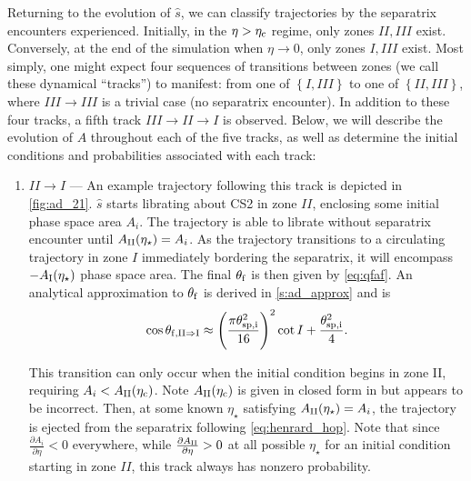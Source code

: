 \documentclass[
        fleqn,
        usenatbib,
        referee,
    ]{mnras}
\newcommand*{\pd}[2]{\frac{\partial#1}{\partial#2}}
\newcommand*{\p}[1]{\left(#1\right)}
\newcommand*{\z}[1]{\left\{#1\right\}}
\begin{document}
Returning to the evolution of $\hat{s}$, we can classify trajectories by the
separatrix encounters experienced. Initially, in the $\eta > \eta_{\rm c}$ regime,
only zones $II, III$ exist. Conversely, at the end of the simulation when $\eta
\to 0$, only zones $I, III$ exist. Most simply, one might expect four sequences
of transitions between zones (we call these dynamical ``tracks'') to manifest:
from one of $\z{I, III}$ to one of $\z{II, III}$, where $III \to III$ is a
trivial case (no separatrix encounter). In addition to these four tracks, a
fifth track $III \to II \to I$ is observed. Below, we will describe the
evolution of $A$ throughout each of the five tracks, as well as determine the
initial conditions and probabilities associated with each track:
\begin{enumerate}
    \item $II \to I$ --- An example trajectory following this track is depicted
        in \autoref{fig:ad_21}. $\hat{s}$ starts librating about CS2 in zone
        $II$, enclosing some initial phase space area $A_i$. The trajectory is
        able to librate without separatrix encounter until $A_{\rm
        II}(\eta_\star) = A_i$. As the trajectory transitions to a circulating
        trajectory in zone $I$ immediately bordering the separatrix, it will
        encompass $-A_{\rm I}(\eta_\star)$ phase space area. The final
        $\theta_{\rm f}$ is then given by \autoref{eq:qfaf}. An analytical
        approximation to $\theta_{\rm f}$ is derived in \autoref{s:ad_approx}
        and is
        \begin{equation}
            \cos \theta_{\rm f, II \Rightarrow I} \approx
                \p{\frac{\pi \theta_{\rm sp, i}^2}{16}}^2 \cot I
                    + \frac{\theta_{\rm sp, i}^2}{4}.\label{eq:qf_21_approx}
        \end{equation}

        This transition can only occur when the initial condition begins in zone
        II, requiring $A_i < A_{\rm II}(\eta_{\rm c})$. Note $A_{\rm II}(\eta_{\rm c})$ is
        given in closed form in \citet{ward2004I} but appears to be incorrect.
        Then, at some known $\eta_\star$ satisfying $A_{\rm II}(\eta_\star) =
        A_i$, the trajectory is ejected from the separatrix following
        \autoref{eq:henrard_hop}. Note that since $\pd{A_i}{\eta} < 0$
        everywhere, while $\pd{A_{\rm II}}{\eta} > 0$ at all possible
        $\eta_\star$ for an initial condition starting in zone $II$, this track
        always has nonzero probability.


\end{enumerate}
\end{document}
